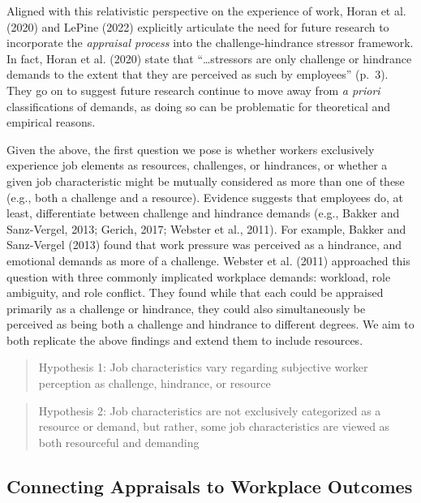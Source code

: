 \documentclass[
  man]{apa7}
\begin{document}
Aligned with this relativistic perspective on the experience of work, Horan et al. (2020) and LePine (2022) explicitly articulate the need for future research to incorporate the \emph{appraisal process} into the challenge-hindrance stressor framework. In fact, Horan et al. (2020) state that ``\ldots stressors are only challenge or hindrance demands to the extent that they are perceived as such by employees'' (p.~3). They go on to suggest future research continue to move away from \emph{a priori} classifications of demands, as doing so can be problematic for theoretical and empirical reasons.

Given the above, the first question we pose is whether workers exclusively experience job elements as resources, challenges, or hindrances, or whether a given job characteristic might be mutually considered as more than one of these (e.g., both a challenge and a resource). Evidence suggests that employees do, at least, differentiate between challenge and hindrance demands (e.g., Bakker and Sanz-Vergel, 2013; Gerich, 2017; Webster et al., 2011). For example, Bakker and Sanz-Vergel (2013) found that work pressure was perceived as a hindrance, and emotional demands as more of a challenge. Webster et al. (2011) approached this question with three commonly implicated workplace demands: workload, role ambiguity, and role conflict. They found while that each could be appraised primarily as a challenge or hindrance, they could also simultaneously be perceived as being both a challenge and hindrance to different degrees. We aim to both replicate the above findings and extend them to include resources.

\begin{quote}
Hypothesis 1: Job characteristics vary regarding subjective worker perception as challenge, hindrance, or resource
\end{quote}

\begin{quote}
Hypothesis 2: Job characteristics are not exclusively categorized as a resource or demand, but rather, some job characteristics are viewed as both resourceful and demanding
\end{quote}

\hypertarget{connecting-appraisals-to-workplace-outcomes}{%
\subsection{Connecting Appraisals to Workplace Outcomes}\label{connecting-appraisals-to-workplace-outcomes}}
\end{document}
